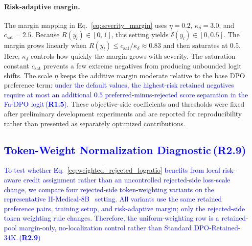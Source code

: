 \documentclass[a4paper,fleqn,doubleblind]{cas-sc}
\DeclareRobustCommand{\added}[1]{\textcolor{blue}{#1}}
\DeclareRobustCommand{\revtag}[1]{\textcolor{blue}{\scriptsize\,(\textbf{#1})}}
\begin{document}
\paragraph{Risk-adaptive margin.}
The margin mapping in Eq.~\ref{eq:severity_margin} uses $\eta=0.2$, $\kappa_{\delta}=3.0$, and $c_{\text{sat}}=2.5$.
Because $R(y_l)\in[0,1]$, this setting yields $\delta(y_l)\in[0,0.5]$.
The margin grows linearly when $R(y_l)\le c_{\text{sat}}/\kappa_{\delta} \approx 0.83$ and then saturates at $0.5$.
Here, $\kappa_{\delta}$ controls how quickly the margin grows with severity.
The saturation constant $c_{\text{sat}}$ prevents a few extreme negatives from producing unbounded logit shifts.
The scale $\eta$ keeps the additive margin moderate relative to the base DPO preference term\added{: under the default values, the highest-risk retained negatives require at most an additional $0.5$ preferred-minus-rejected score separation in the Fa-DPO logit}\revtag{R1.5}.
These objective-side coefficients and thresholds were fixed after preliminary development experiments and are reported for reproducibility rather than presented as separately optimized contributions.

\subsection{\added{Token-Weight Normalization Diagnostic}\revtag{R2.9}}
\label{app:normalization_stability}

\added{To test whether Eq.~\ref{eq:weighted_rejected_logratio} benefits from local risk-aware credit assignment rather than an uncontrolled rejected-side loss-scale change, we compare four rejected-side token-weighting variants on the representative II-Medical-8B~\cite{intelligentinternet2025iimedical8b} setting. All variants use the same retained preference pairs, training setup, and risk-adaptive margin; only the rejected-side token weighting rule changes. Therefore, the uniform-weighting row is a retained-pool margin-only, no-localization control rather than Standard DPO-Retained-34K.}\revtag{R2.9}
\end{document}

